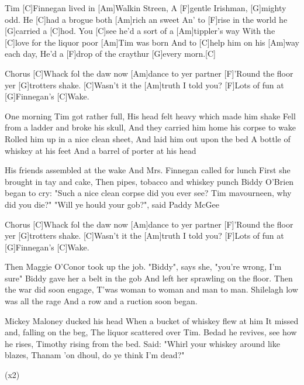 

\begin{guitar}
	Tim [C]Finnegan lived in [Am]Walkin Streen,
	A [F]gentle Irishman, [G]mighty odd.
	He [C]had a brogue both [Am]rich an sweet
	An' to [F]rise in the world he [G]carried a [C]hod.
	You [C]see he'd a sort of a [Am]tippler's way 
	With the [C]love for the liquor poor [Am]Tim was born
	And to [C]help him on his [Am]way each day, 
	He'd a [F]drop of the craythur [G]every morn.[C]{}
	
  \begin{chorus}{Chorus}
	[C]Whack fol the daw now [Am]dance to yer partner
	[F]'Round the floor yer [G]trotters shake.
	[C]Wasn't it the [Am]truth I told you?
	[F]Lots of fun at [G]Finnegan's [C]Wake.%
  \end{chorus}
	
	One morning Tim got rather full,
	His head felt heavy which made him shake
	Fell from a ladder and broke his skull,
	And they carried him home his corpse to wake
	Rolled him up in a nice clean sheet, 
	And laid him out upon the bed
	A bottle of whiskey at his feet 
	And a barrel of porter at his head
	
	 
	
	\pagebreak
	
	His friends assembled at the wake 
	And Mrs. Finnegan called for lunch
	First she brought in tay and cake, 
	Then pipes, tobacco and whiskey punch
	Biddy O'Brien began to cry: 
	"Such a nice clean corpse did you ever see?
	Tim mavourneen, why did you die?" 
	"Will ye hould your gob?", said Paddy McGee
	
  \begin{chorus}{Chorus}
	[C]Whack fol the daw now [Am]dance to yer partner
	[F]'Round the floor yer [G]trotters shake.
	[C]Wasn't it the [Am]truth I told you?
	[F]Lots of fun at [G]Finnegan's [C]Wake.%
  \end{chorus}
	
	Then Maggie O'Conor took up the job. 
	"Biddy", says she, "you're wrong, I'm sure"
	Biddy gave her a belt in the gob 
	And left her sprawling on the floor.
	Then the war did soon engage, 
	T'was woman to woman and man to man.
	Shilelagh low was all the rage 
	And a row and a ruction soon began.
	
	 
	
	Mickey Maloney ducked his head 
	When a bucket of whiskey flew at him
	It missed and, falling on the beg,
	The liquor scattered over Tim.
	Bedad he revives, see how he rises,
	Timothy rising from the bed.
	Said: "Whirl your whiskey around like blazes, 
	Thanam 'on dhoul, do ye think I'm dead?"
	
	  (x2)
\end{guitar}
